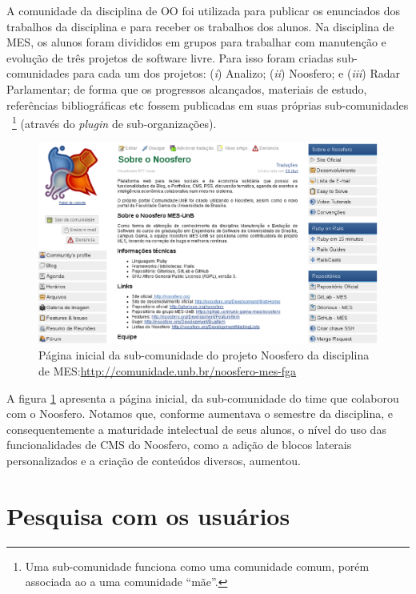A comunidade da disciplina de OO foi utilizada para  publicar os enunciados dos
trabalhos da disciplina e para receber os trabalhos dos alunos.
%
Na disciplina de MES, os alunos foram divididos em grupos para trabalhar com
manutenção e evolução de três projetos de software livre. Para isso foram
criadas sub-comunidades para cada um dos projetos: 
%
(\textit{i}) Analizo;
(\textit{ii}) Noosfero;
e (\textit{iii}) Radar Parlamentar;
%
de forma que os progressos alcançados, materiais de estudo, referências
bibliográficas etc fossem publicadas em suas próprias sub-comunidades%
~\footnote{Uma sub-comunidade funciona como uma comunidade comum, porém
associada ao a uma comunidade ``mãe''.} (através do \textit{plugin} de
sub-organizações).

\begin{figure}[h!]
    \centering
    \includegraphics[keepaspectratio=true,scale=0.35]
      {figuras/Noosfero-MES.eps}
    \caption{Página inicial da sub-comunidade do projeto Noosfero da disciplina
    de MES:\newline \url{http://comunidade.unb.br/noosfero-mes-fga}}
    \label{mes-noosfero}
\end{figure}

A figura \ref{mes-noosfero} apresenta a página inicial,  da sub-comunidade do
time que colaborou com o Noosfero. Notamos que, conforme aumentava o semestre da
disciplina, e consequentemente a maturidade intelectual de seus alunos, o nível
do uso das funcionalidades de CMS do Noosfero, como a adição de blocos
laterais personalizados e a criação de conteúdos diversos, aumentou.

\section{Pesquisa com os usuários}
